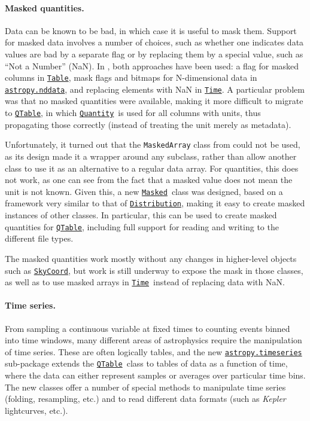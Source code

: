\documentclass[modern]{aastex631}
\newcommand{\astropysubpkg}[1]{\href{http://docs.astropy.org/en/stable/#1/index.html}{\texttt{astropy.#1}}\xspace}
\newcommand{\astropyapi}[2]{\href{https://docs.astropy.org/en/stable/api/astropy.#1.html}{#2}}
\newcommand{\astropyapidoc}[2]{\astropyapi{#1}{\texttt{#2}\xspace}}
\newcommand{\astropySkyCoord}{\astropyapidoc{coordinates.SkyCoord}{SkyCoord}}
\newcommand{\astropyTable}{\astropyapidoc{table.Table}{Table}}
\newcommand{\astropyQTable}{\astropyapidoc{table.QTable}{QTable}}
\newcommand{\astropyTime}{\astropyapidoc{time.Time}{Time}}
\newcommand{\astropyDistribution}{\astropyapidoc{uncertainty.Distribution}{Distribution}}
\newcommand{\astropyQuantity}{\astropyapidoc{units.Quantity}{Quantity}}
\newcommand{\astropyMasked}{\astropyapidoc{utils.masked.Masked}{Masked}}
\begin{document}
\paragraph{Masked quantities.}  Data can be known to be bad, in which
case it is useful to mask them.  Support for masked data involves a
number of choices, such as whether one indicates data values are bad
by a separate flag or by replacing them by a special value, such as
``Not a Number'' (NaN).  In \astropypkg, both approaches have been
used: a flag for masked columns in \astropyTable, mask flags and
bitmaps for N-dimensional data in \astropysubpkg{nddata}, and
replacing elements with NaN in \astropyTime.  A particular problem was
that no masked quantities were available, making it more difficult to
migrate to \astropyQTable, in which \astropyQuantity\ is used for all
columns with units, thus propagating those correctly (instead of
treating the unit merely as metadata).

Unfortunately, it turned out that the \texttt{MaskedArray} class from
 could not be used, as its design made it a wrapper
around any subclass, rather than allow another class to use it as an
alternative to a regular data array.  For quantities, this does not
work, as one can see from the fact that a masked value does not mean
the unit is not known.  Given this, a new \astropyMasked\ class was
designed, based on a framework very similar to that of
\astropyDistribution, making it easy to create masked instances of
other classes.  In particular, this can be used to create masked
quantities for \astropyQTable, including full support for reading and
writing to the different file types.

The masked quantities work mostly without any changes in higher-level
objects such as \astropySkyCoord, but work is still underway to expose
the mask in those classes, as well as to use masked arrays in
\astropyTime\ instead of replacing data with NaN.

\paragraph{Time series.}  From sampling a continuous variable at fixed
times to counting events binned into time windows, many different
areas of astrophysics require the manipulation of time series.  These
are often logically tables, and the new \astropysubpkg{timeseries}
sub-package extends the \astropyQTable\ class to tables of data as a
function of time, where the data can either represent samples or
averages over particular time bins.  The new classes offer a number of
special methods to manipulate time series (folding, resampling, etc.)
and to read different data formats (such as {\em Kepler} lightcurves,
etc.).
\end{document}
